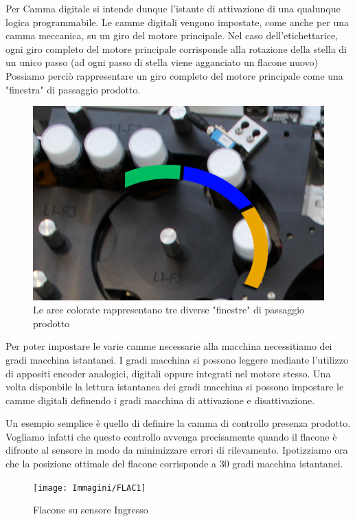 \documentclass[12pt, a4paper, oneside]{book}
\begin{document}
Per Camma digitale si intende dunque l'istante di attivazione di una qualunque logica programmabile. Le camme digitali vengono impostate, come anche per una camma meccanica, su un giro del motore principale.
Nel caso dell'etichettarice, ogni giro completo del motore principale corrisponde alla rotazione della stella di un unico passo (ad ogni passo di stella viene agganciato un flacone nuovo)
Possiamo perciò rappresentare un giro completo del motore principale come una "finestra" di passaggio prodotto.

\begin{figure}[H]
	\centering
	\includegraphics[width=12cm]{Immagini/FIN1}
	\caption{Le aree colorate rappresentano tre diverse "finestre" di passaggio prodotto}
	\label{FIN1}
\end{figure}

Per poter impostare le varie camme necessarie alla macchina necessitiamo dei gradi macchina istantanei. I gradi macchina si possono leggere mediante l'utilizzo di appositi encoder analogici, digitali oppure integrati nel motore stesso.
Una volta disponbile la lettura istantanea dei gradi macchina si possono impostare le camme digitali definendo i gradi macchina di attivazione e disattivazione. 

Un esempio semplice è quello di definire la camma di controllo presenza prodotto. Vogliamo infatti che questo controllo avvenga precisamente quando il flacone è difronte al sensore in modo da minimizzare errori di rilevamento.
Ipotizziamo ora che la posizione ottimale del flacone corrisponde a 30 gradi macchina istantanei. 

\begin{figure}[H]
	\centering
	\texttt{[image: Immagini/FLAC1]}
	\caption{ Flacone su sensore Ingresso}
	\label{FLAC1}
\end{figure}
\end{document}
